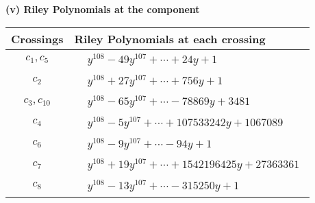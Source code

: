 \documentclass[1p]{elsarticle_modified}
\theoremstyle{definition}
\begin{document}
\newpage\renewcommand{\arraystretch}{1}
\flushleft \textbf{(v) Riley Polynomials at the component}\newline \\
\begin{tabular}{m{50pt}|m{274pt}}
Crossings & \hspace{64pt}Riley Polynomials at each crossing \\
\hline $$\begin{aligned}c_{1},c_{5}\end{aligned}$$&$\begin{aligned}
&y^{108}-49 y^{107}+\cdots+24 y+1
\end{aligned}$\\
\hline $$\begin{aligned}c_{2}\end{aligned}$$&$\begin{aligned}
&y^{108}+27 y^{107}+\cdots+756 y+1
\end{aligned}$\\
\hline $$\begin{aligned}c_{3},c_{10}\end{aligned}$$&$\begin{aligned}
&y^{108}-65 y^{107}+\cdots-78869 y+3481
\end{aligned}$\\
\hline $$\begin{aligned}c_{4}\end{aligned}$$&$\begin{aligned}
&y^{108}-5 y^{107}+\cdots+107533242 y+1067089
\end{aligned}$\\
\hline $$\begin{aligned}c_{6}\end{aligned}$$&$\begin{aligned}
&y^{108}-9 y^{107}+\cdots-94 y+1
\end{aligned}$\\
\hline $$\begin{aligned}c_{7}\end{aligned}$$&$\begin{aligned}
&y^{108}+19 y^{107}+\cdots+1542196425 y+27363361
\end{aligned}$\\
\hline $$\begin{aligned}c_{8}\end{aligned}$$&$\begin{aligned}
&y^{108}-13 y^{107}+\cdots-315250 y+1
\end{aligned}$\\

\end{tabular}
\end{document}
